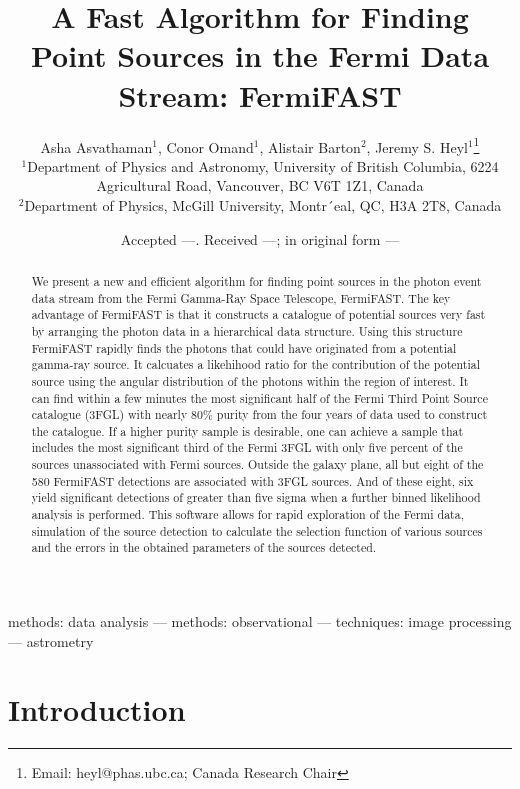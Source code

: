 \documentclass[useAMS,usenatbib]{mn2e}
\title[FermiFAST]{A Fast Algorithm for Finding Point Sources
in the Fermi Data Stream: FermiFAST}
\author[A. Asvathaman {\em et al.}]{Asha Asvathaman$^{1}$, Conor Omand$^{1}$, Alistair Barton$^{2}$,
  Jeremy S. Heyl$^{1}$\thanks{Email: heyl@phas.ubc.ca; Canada Research Chair} \\
$^{1}$Department of Physics and Astronomy, University of British
  Columbia, 6224 Agricultural Road, Vancouver, BC V6T 1Z1, Canada\\
$^{2}$Department of Physics, McGill University, Montr´eal, QC, H3A 2T8, Canada}
\begin{document}
\date{Accepted ---. Received ---; in original form ---}

\pagerange{\pageref{firstpage}--\pageref{lastpage}} 

\maketitle

\label{firstpage}

\begin{abstract}
  We present a new and efficient algorithm for finding point sources
  in the photon event data stream from the Fermi Gamma-Ray Space
  Telescope, FermiFAST. The key advantage of FermiFAST is that it
  constructs a catalogue of potential sources very fast by arranging
  the photon data in a hierarchical data structure. Using this
  structure FermiFAST rapidly finds the photons that could have
  originated from a potential gamma-ray source.  It calcuates a
  likehihood ratio for the contribution of the potential source using
  the angular distribution of the photons within the region of
  interest.  It can find within a few minutes the most significant
  half of the Fermi Third Point Source catalogue (3FGL) with nearly
  80\% purity from the four years of data used to construct the
  catalogue.  If a higher purity sample is desirable, one can achieve
  a sample that includes the most significant third of the Fermi 3FGL
  with only five percent of the sources unassociated with Fermi
  sources.  Outside the galaxy plane, all but eight of the 580
  FermiFAST detections are associated with 3FGL sources.  And of these
  eight, six yield significant detections of greater than five sigma
  when a further binned likelihood analysis is performed.  This
  software allows for rapid exploration of the Fermi data, simulation
  of the source detection to calculate the selection function of
  various sources and the errors in the obtained parameters of the
  sources detected.
  
\end{abstract}

\begin{keywords}
methods: data analysis --- methods: observational --- techniques:
image processing --- astrometry
\end{keywords}

\section{Introduction}
\end{document}
